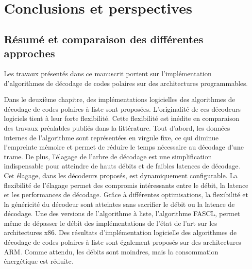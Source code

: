

{
\chapter*{Conclusions et perspectives}
}
{
\label{sec:Conclusion}
}


\section*{Résumé et comparaison des différentes approches}

Les travaux présentés dans ce manuscrit portent sur l'implémentation d'algorithmes de décodage de codes polaires sur des architectures programmables.

Dans le deuxième chapitre, des implémentations logicielles des algorithmes de décodage de codes polaires à liste sont proposées. L'originalité de ces décodeurs logiciels tient à leur forte flexibilité. Cette flexibilité est inédite en comparaison des travaux préalables publiés dans la littérature. Tout d'abord, les données internes de l'algorithme sont représentées en virgule fixe, ce qui diminue l'empreinte mémoire et permet de réduire le temps nécessaire au décodage d'une trame. De plus, l'élagage de l'arbre de décodage est une simplification indispensable pour atteindre de hauts débits et de faibles latences de décodage. Cet élagage, dans les décodeurs proposés, est dynamiquement configurable. La flexibilité de l'élagage permet des compromis intéressants entre le débit, la latence et les performances de décodage. Grâce à différentes optimisations, la flexibilité et la généricité du décodeur sont atteintes sans sacrifier le débit ou la latence de décodage. Une des versions de l'algorithme à liste, l'algorithme FASCL, permet même de dépasser le débit des implémentations de l'état de l'art sur les architectures x86. Des résultats d'implémentation logicielle des algorithmes de décodage de codes polaires à liste sont également proposés sur des architectures ARM. Comme attendu, les débits sont moindres, mais la consommation énergétique est réduite.

